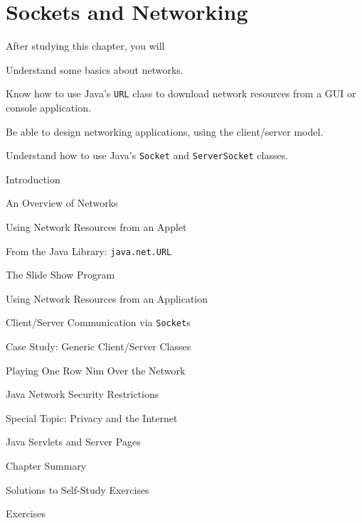 
\setcounter{SSTUDYcount}{1}
\setcounter{chapter}{14}

\chapter{Sockets and Networking}
\label{chapter-sockets}


\CObegin
{}
\noindent After studying this chapter, you will

\begin{COBL}
\item  Understand some basics about networks.
\item  Know how to use Java's {\tt URL} class
to download network resources from a GUI or console application.
\item  Be able to design networking applications,
using the client/server model.
\item  Understand how to use Java's {\tt Socket}
and {\tt ServerSocket} classes.
\end{COBL}

\begin{COL}
\item {Introduction}
\item {An Overview of Networks}
\item {Using Network Resources from an Applet}
\item {From the Java Library: {\tt java.net.URL}}
\item {The Slide Show Program}
\item {Using Network Resources from an Application}
\item {Client/Server Communication via {\tt Socket}s}
\item {Case Study: Generic Client/Server Classes}
\item {Playing One Row Nim Over the Network}
\item {Java Network Security Restrictions}
\item[] {{\color{cyan}Special Topic:} Privacy and the Internet}
\item {Java Servlets and Server Pages}
\par\small\item[] {Chapter Summary}
\par\small\item[] {Solutions to Self-Study Exercises}
\par\small\item[] {Exercises}
\end{COL}
\COend


